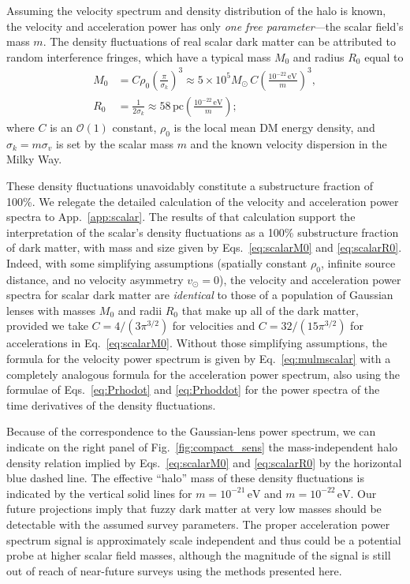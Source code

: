 \documentclass[prd,aps,twocolumn,nofootinbib,superscriptaddress,preprintnumbers,balancelastpage,longbibliography,floatfix]{revtex4-1}
\begin{document}
Assuming the velocity spectrum and density distribution of the halo is known, the velocity and acceleration power has only \emph{one free parameter}---the scalar field's mass $m$. The density fluctuations of real scalar dark matter can be attributed to random interference fringes, which have a typical mass $M_0$ and radius $R_0$ equal to
\begin{align}
M_0 &= C \rho_0 \left(\frac{\pi}{\sigma_k}\right)^3 \approx  5 \times 10^5 M_\odot \, C \left(\frac{10^{-22}\,\mathrm{eV}}{m}\right)^3,\label{eq:scalarM0}\\
R_0 &= \frac{1}{2\sigma_k} \approx 58\,\mathrm{pc} \left(\frac{10^{-22}\,\mathrm{eV}}{m}\right); \label{eq:scalarR0}
\end{align}
where $C$ is an $\mathcal{O}(1)$ constant, $\rho_0$ is the local mean DM energy density, and $\sigma_k = m \sigma_v$ is set by the scalar mass $m$ and the known velocity dispersion in the Milky Way.

These density fluctuations unavoidably constitute a substructure fraction of 100{\%}. We relegate the detailed calculation of the velocity and acceleration power spectra to App.~\ref{app:scalar}. The results of that calculation support the interpretation of the scalar's density fluctuations as a 100\% substructure fraction of dark matter, with mass and size given by Eqs.~\eqref{eq:scalarM0} and \eqref{eq:scalarR0}. Indeed, with some simplifying assumptions (spatially constant $\rho_0$, infinite source distance, and no velocity asymmetry $v_\odot = 0$), the velocity and acceleration power spectra for scalar dark matter are \emph{identical} to those of a population of Gaussian lenses with masses $M_0$ and radii $R_0$ that make up all of the dark matter, provided we take $C = 4/(3\pi^{3/2})$ for velocities and $C = 32/(15\pi^{3/2})$ for accelerations in Eq.~\eqref{eq:scalarM0}. Without those simplifying assumptions, the formula for the velocity power spectrum is given by Eq.~\eqref{eq:mulmscalar} with a completely analogous formula for the acceleration power spectrum, also using the formulae of Eqs.~\eqref{eq:Prhodot} and \eqref{eq:Prhoddot} for the power spectra of the time derivatives of the density fluctuations.

Because of the correspondence to the Gaussian-lens power spectrum, we can indicate on the right panel of Fig.~\ref{fig:compact_sens} the mass-independent halo density relation implied by Eqs.~\eqref{eq:scalarM0} and \eqref{eq:scalarR0} by the horizontal blue dashed line. The effective ``halo'' mass of these density fluctuations is indicated by the vertical solid lines for $m = 10^{-21}\,\mathrm{eV}$ and $m = 10^{-22}\,\mathrm{eV}$. Our future projections imply that fuzzy dark matter at very low masses should be detectable with the assumed survey parameters. The proper acceleration power spectrum signal is approximately scale independent and thus could be a potential probe at higher scalar field masses, although the magnitude of the signal is still out of reach of near-future surveys using the methods presented here.
\end{document}

